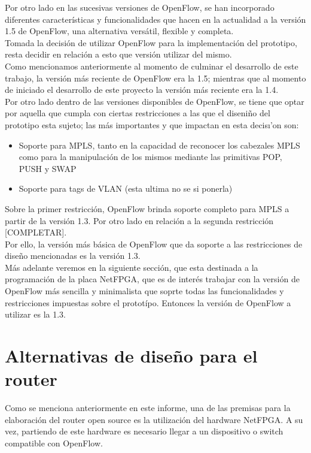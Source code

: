 Por otro lado en las sucesivas versiones de OpenFlow, se han incorporado diferentes caracter\'isticas y funcionalidades que hacen en la actualidad a la versi\'on 1.5 de OpenFlow, una alternativa vers\'atil, flexible y completa.\\

Tomada la decisi\'on de utilizar OpenFlow para la implementaci\'on del prototipo, resta decidir en relaci\'on a esto que versi\'on utilizar del mismo.\\
Como mencionamos anteriormente al momento de culminar el desarrollo de este trabajo, la versi\'on m\'as reciente de OpenFlow era la 1.5; mientras que al momento de iniciado el desarrollo de este proyecto la versi\'on m\'as reciente era la 1.4.\\

Por otro lado dentro de las versiones disponibles de OpenFlow, se tiene que optar por aquella que cumpla con ciertas restricciones a las que el diseni\~no del prototipo esta sujeto; las m\'as importantes y que impactan en esta decis\i'on son:
\begin{itemize}
\item Soporte para MPLS, tanto en la capacidad de reconocer los cabezales MPLS como para la manipulaci\'on de los mismos mediante las primitivas POP, PUSH y SWAP
\item Soporte para tags de VLAN (esta ultima no se si ponerla)
\end{itemize}
Sobre la primer restricci\'on, OpenFlow brinda soporte completo para MPLS a partir de la versi\'on 1.3. Por otro lado en relaci\'on a la segunda restricci\'on [COMPLETAR].\\
Por ello, la versi\'on m\'as b\'asica de OpenFlow que da soporte a las restricciones de dise\~no mencionadas es la versi\'on 1.3.\\

M\'as adelante veremos en la siguiente secci\'on, que esta destinada a la programaci\'on de la placa NetFPGA, que es de inter\'es trabajar con la versi\'on de OpenFlow m\'as sencilla y minimalista que soprte todas las funcionalidades y restricciones impuestas sobre el protot\'ipo. Entonces la versi\'on de OpenFlow a utilizar es la 1.3.

\section[Alternativas de dise\~no para el router]{Alternativas de dise\~no para el router}

Como se menciona anteriormente en este informe, una de las premisas para la elaboraci\'on del router open source es la utilizaci\'on del hardware NetFPGA. A su vez, partiendo de este hardware es necesario llegar a un dispositivo o switch compatible con OpenFlow.\\ 

